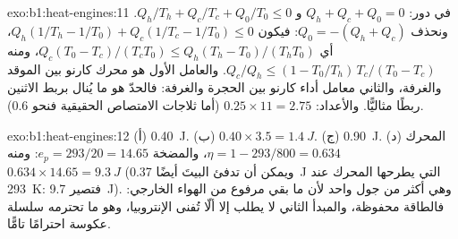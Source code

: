 \begin{solution}{exo:b1:heat-engines:11}
في دور: $Q_h + Q_c + Q_0 = 0$ و $Q_h/T_h + Q_c/T_c + Q_0/T_0 \leq 0$.
ونحذف $Q_0 = -(Q_h + Q_c)$: فيكون $Q_h(1/T_h - 1/T_0) + Q_c(1/T_c - 1/T_0) \leq 0$،
أي $Q_c(T_0 - T_c)/(T_cT_0) \leq Q_h(T_h - T_0)/(T_hT_0)$، ومنه
$Q_c/Q_h \leq (1 - T_0/T_h)\,T_c/(T_0 - T_c)$. والعامل الأول هو
 محرك كارنو بين الموقد والغرفة، والثاني
معامل أداء  كارنو بين الحجرة والغرفة: فالحدّ هو ما
يُنال بربط الاثنين ربطًا مثاليًّا. والأعداد: $0.25 \times 11 = 2.75$
(أما ثلاجات الامتصاص الحقيقية فنحو $0.6$).
\end{solution}

\begin{solution}{exo:b1:heat-engines:12}
(أ) \qty{0.40}{J}. (ب) $0.40 \times 3.5 = \qty{1.4}{J}$. (ج) \qty{0.90}{J}.
(د) المحرك $\eta = 1 - 293/800 = 0.634$، والمضخة $e_p = 293/20 = 14.65$:
ومنه $0.634 \times 14.65 = \qty{9.3}{J}$ (ويمكن أن تدفئ البيتَ أيضًا \qty{0.37}{J} التي يطرحها المحرك
عند \qty{293}{K}: فتصير \qty{9.7}{J}). وهي أكثر من
جول واحد لأن ما بقي مرفوع من الهواء الخارجي: فالطاقة
محفوظة، والمبدأ الثاني لا يطلب إلا ألّا تُفنى الإنتروبيا،
وهو ما تحترمه سلسلة عكوسة احترامًا تامًّا.
\end{solution}

